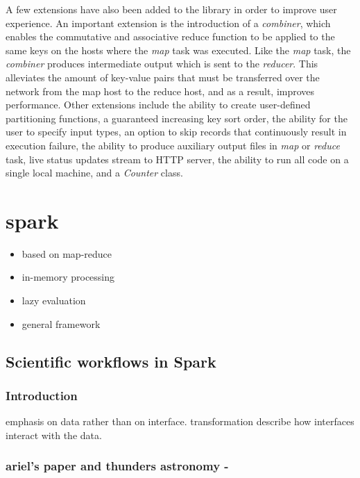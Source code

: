 \documentclass{report}
\begin{document}
        A few extensions have also been added to the library in order to 
        improve user experience. An important extension is the introduction 
        of a \textit{combiner}, which enables the commutative and associative 
        reduce function to be applied to the same keys on the hosts where the 
        \textit{map} task was executed. Like the \textit{map} task, the 
        \textit{combiner} produces intermediate output which is sent to the 
        \textit{reducer}. This alleviates the amount of key-value pairs that 
        must be transferred over the network from the map host to the reduce 
        host, and as a result, improves performance. Other extensions include 
        the ability to create user-defined partitioning functions, a guaranteed 
        increasing key sort order, the ability for the user to specify input 
        types, an option to skip records that continuously result in execution 
        failure, the ability to produce auxiliary output files in \textit{map} 
        or \textit{reduce} task, live status updates stream to HTTP server,
        the ability to run all code on a single local machine, and a 
        \textit{Counter} class.
    \section{spark} 
        \begin{itemize} 
            \item based on map-reduce 
            \item in-memory processing 
            \item lazy evaluation 
            \item general framework 
        \end{itemize} 

    \subsection{Scientific workflows in Spark}
        \subsubsection{Introduction}
        emphasis on data rather than on interface. transformation describe how
    interfaces interact with the data. 
        \subsubsection{ariel's paper and thunders astronomy - }
\end{document}
